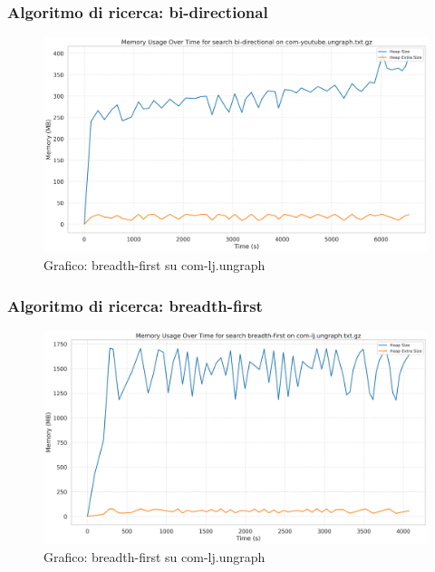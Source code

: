\documentclass{article}
\begin{document}
\subsubsection{Algoritmo di ricerca: bi-directional}
\begin{figure}[h]\centering
\includegraphics[width=\textwidth]{../plots/com-youtube.ungraph_bi-directional.png}
\caption{Grafico: breadth-first su com-lj.ungraph}
\end{figure}
\subsubsection{Algoritmo di ricerca: breadth-first}
\begin{figure}[h]\centering
\includegraphics[width=\textwidth]{../plots/com-lj.ungraph_breadth-first.png}
\caption{Grafico: breadth-first su com-lj.ungraph}
\end{figure}
\end{document}
